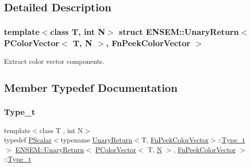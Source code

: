 \subsection{Detailed Description}
\subsubsection*{template$<$class T, int N$>$\newline
struct E\+N\+S\+E\+M\+::\+Unary\+Return$<$ P\+Color\+Vector$<$ T, N $>$, Fn\+Peek\+Color\+Vector $>$}

Extract color vector components. 

\subsection{Member Typedef Documentation}
\mbox{\label{structENSEM_1_1UnaryReturn_3_01PColorVector_3_01T_00_01N_01_4_00_01FnPeekColorVector_01_4_a827d146f0d51b63a38339bc9218d64d4}} 
\subsubsection{\texorpdfstring{Type\_t}{Type\_t}\hspace{0.1cm}{\footnotesize\ttfamily [1/3]}}
{\footnotesize\ttfamily template$<$class T , int N$>$ \\
typedef \mbox{\hyperlink{classENSEM_1_1PScalar}{P\+Scalar}}$<$typename \mbox{\hyperlink{structENSEM_1_1UnaryReturn}{Unary\+Return}}$<$T, \mbox{\hyperlink{structENSEM_1_1FnPeekColorVector}{Fn\+Peek\+Color\+Vector}}$>$\+::\mbox{\hyperlink{structENSEM_1_1UnaryReturn_3_01PColorVector_3_01T_00_01N_01_4_00_01FnPeekColorVector_01_4_a827d146f0d51b63a38339bc9218d64d4}{Type\+\_\+t}}$>$ \mbox{\hyperlink{structENSEM_1_1UnaryReturn}{E\+N\+S\+E\+M\+::\+Unary\+Return}}$<$ \mbox{\hyperlink{classENSEM_1_1PColorVector}{P\+Color\+Vector}}$<$ T, \mbox{\hyperlink{adat__devel_2lib_2hadron_2operator__name__util_8cc_a7722c8ecbb62d99aee7ce68b1752f337}{N}} $>$, \mbox{\hyperlink{structENSEM_1_1FnPeekColorVector}{Fn\+Peek\+Color\+Vector}} $>$\+::\mbox{\hyperlink{structENSEM_1_1UnaryReturn_3_01PColorVector_3_01T_00_01N_01_4_00_01FnPeekColorVector_01_4_a827d146f0d51b63a38339bc9218d64d4}{Type\+\_\+t}}}


